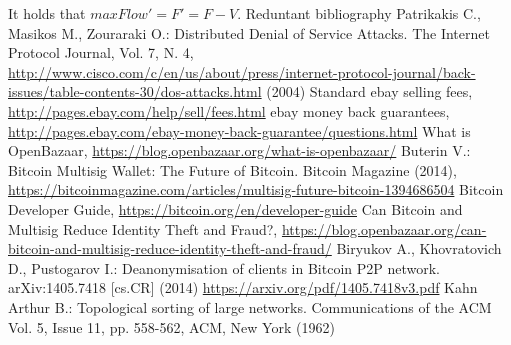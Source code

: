    It holds that $maxFlow' = F' = F - V$.
Reduntant bibliography
     Patrikakis C., Masikos M., Zouraraki O.: Distributed Denial of Service Attacks. The Internet Protocol Journal, Vol. 7,
     N. 4,
     \url{http://www.cisco.com/c/en/us/about/press/internet-protocol-journal/back-issues/table-contents-30/dos-attacks.html}
     (2004)
     Standard ebay selling fees, \url{http://pages.ebay.com/help/sell/fees.html}
     ebay money back guarantees, \url{http://pages.ebay.com/ebay-money-back-guarantee/questions.html}
     What is OpenBazaar, \url{https://blog.openbazaar.org/what-is-openbazaar/}
     Buterin V.: Bitcoin Multisig Wallet: The Future of Bitcoin. Bitcoin Magazine (2014),
     \url{https://bitcoinmagazine.com/articles/multisig-future-bitcoin-1394686504}
     Bitcoin Developer Guide, \url{https://bitcoin.org/en/developer-guide}
     Can Bitcoin and Multisig Reduce Identity Theft and Fraud?,
     \url{https://blog.openbazaar.org/can-bitcoin-and-multisig-reduce-identity-theft-and-fraud/}
     Biryukov A., Khovratovich D., Pustogarov I.: Deanonymisation of clients in Bitcoin P2P network. arXiv:1405.7418 [cs.CR]
     (2014)
     \url{https://arxiv.org/pdf/1405.7418v3.pdf}
     Kahn Arthur B.: Topological sorting of large networks. Communications of the ACM Vol. 5, Issue 11, pp. 558-562, ACM,
     New York (1962)
